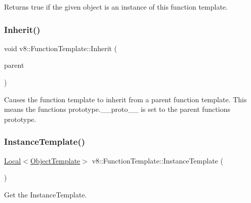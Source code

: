 Returns true if the given object is an instance of this function template. \mbox{\label{classv8_1_1FunctionTemplate_abc11c462facf11bafd541892815c5425}} 
\subsubsection{\texorpdfstring{Inherit()}{Inherit()}}
{\footnotesize\ttfamily void v8\+::\+Function\+Template\+::\+Inherit (\begin{DoxyParamCaption}\item[{\mbox{\hyperlink{classv8_1_1Local}{Local}}$<$ \mbox{\hyperlink{classv8_1_1FunctionTemplate}{Function\+Template}} $>$}]{parent }\end{DoxyParamCaption})}

Causes the function template to inherit from a parent function template. This means the function\textquotesingle{}s prototype.\+\_\+\+\_\+proto\+\_\+\+\_\+ is set to the parent function\textquotesingle{}s prototype. \mbox{\label{classv8_1_1FunctionTemplate_a00dd9725566908e8fd14064542f5a781}} 
\subsubsection{\texorpdfstring{Instance\+Template()}{InstanceTemplate()}}
{\footnotesize\ttfamily \mbox{\hyperlink{classv8_1_1Local}{Local}}$<$\mbox{\hyperlink{classv8_1_1ObjectTemplate}{Object\+Template}}$>$ v8\+::\+Function\+Template\+::\+Instance\+Template (\begin{DoxyParamCaption}{ }\end{DoxyParamCaption})}

Get the Instance\+Template. \mbox{\label{classv8_1_1FunctionTemplate_a0724f26034d01ce76bd106b193ab7e7a}} 
